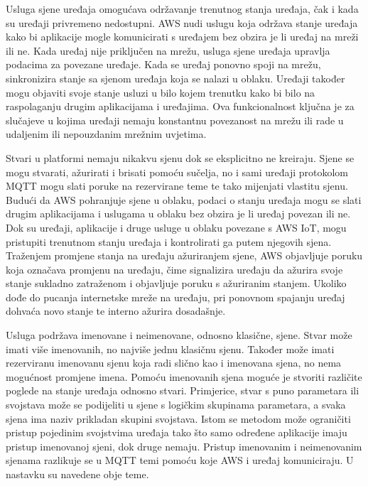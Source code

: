 Usluga sjene uređaja  omogućava održavanje trenutnog stanja uređaja, čak i kada su uređaji privremeno nedostupni. AWS nudi uslugu koja održava stanje uređaja kako bi aplikacije mogle komunicirati s uređajem bez obzira je li uređaj na mreži ili ne. Kada uređaj nije priključen na mrežu, usluga sjene uređaja upravlja podacima za povezane uređaje. Kada se uređaj ponovno spoji na mrežu, sinkronizira stanje sa sjenom uređaja koja se nalazi u oblaku. Uređaji također mogu objaviti svoje stanje usluzi u bilo kojem trenutku kako bi bilo na raspolaganju drugim aplikacijama i uređajima. Ova funkcionalnost ključna je za slučajeve u kojima uređaji nemaju konstantnu povezanost na mrežu ili rade u udaljenim ili nepouzdanim mrežnim uvjetima.

Stvari  u platformi nemaju nikakvu sjenu dok se eksplicitno ne kreiraju. Sjene se mogu stvarati, ažurirati i brisati pomoću sučelja, no i sami uređaji protokolom MQTT mogu slati poruke na rezervirane teme te tako mijenjati vlastitu sjenu. Budući da AWS pohranjuje sjene u oblaku, podaci o stanju uređaja mogu se slati drugim aplikacijama i uslugama u oblaku bez obzira je li uređaj povezan ili ne.  Dok su uređaji, aplikacije i druge usluge u oblaku povezane s AWS IoT, mogu pristupiti trenutnom stanju uređaja i kontrolirati ga putem njegovih sjena. Traženjem promjene stanja na uređaju ažuriranjem sjene, AWS objavljuje poruku koja označava promjenu na uređaju, čime signalizira uređaju da ažurira svoje stanje sukladno zatraženom i objavljuje poruku s ažuriranim stanjem. Ukoliko dođe do pucanja internetske mreže na uređaju, pri ponovnom spajanju uređaj dohvaća novo stanje te interno ažurira dosadašnje.

Usluga podržava imenovane i neimenovane, odnosno klasične, sjene. Stvar može imati više imenovanih, no najviše jednu klasičnu sjenu. Također može imati rezerviranu imenovanu sjenu koja radi slično kao i imenovana sjena, no nema mogućnost promjene imena. Pomoću imenovanih sjena moguće je stvoriti različite poglede na stanje uređaja odnosno stvari. Primjerice, stvar s puno parametara ili svojstava može se podijeliti u sjene s logičkim skupinama parametara, a svaka sjena ima naziv prikladan skupini svojstava. Istom se metodom može ograničiti pristup pojedinim svojstvima uređaja tako što samo određene aplikacije imaju pristup imenovanoj sjeni, dok druge nemaju. Pristup imenovanim i neimenovanim sjenama razlikuje se u MQTT temi pomoću koje AWS i uređaj komuniciraju. U nastavku su navedene obje teme. 

